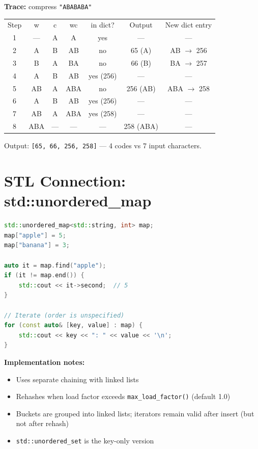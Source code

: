 \textbf{Trace:} compress \texttt{"ABABABA"}

\begin{center}
\begin{tabular}{ccccccc}
\toprule
Step & w & c & wc & in dict? & Output & New dict entry \\
1 & — & A & A & yes & — & — \\
2 & A & B & AB & no & 65 (A) & AB $\to $ 256 \\
3 & B & A & BA & no & 66 (B) & BA $\to $ 257 \\
4 & A & B & AB & yes (256) & — & — \\
5 & AB & A & ABA & no & 256 (AB) & ABA $\to $ 258 \\
6 & A & B & AB & yes (256) & — & — \\
7 & AB & A & ABA & yes (258) & — & — \\
8 & ABA & — & — & — & 258 (ABA) & — \\

\bottomrule
\end{tabular}
\end{center}
Output: \texttt{[65, 66, 256, 258]} — 4 codes vs 7 input characters.

\section{STL Connection: std::unordered\_map}

\begin{lstlisting}[language=C++]
std::unordered_map<std::string, int> map;
map["apple"] = 5;
map["banana"] = 3;

auto it = map.find("apple");
if (it != map.end()) {
    std::cout << it->second;  // 5
}

// Iterate (order is unspecified)
for (const auto& [key, value] : map) {
    std::cout << key << ": " << value << '\n';
}
\end{lstlisting}

\textbf{Implementation notes:}
\begin{itemize}
\item Uses separate chaining with linked lists
\item Rehashes when load factor exceeds \texttt{max\_load\_factor()} (default 1.0)
\item Buckets are grouped into linked lists; iterators remain valid after insert (but not after rehash)
\item \texttt{std::unordered\_set} is the key-only version
\end{itemize}

